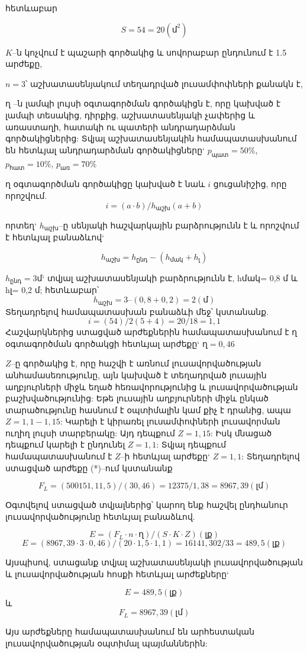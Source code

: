 \documentclass[12pt]{article}
\begin{document}
\begin{sloppypar}
հետևաբար         

$$S = 54 = 20 (մ^2)$$ 

$K$–ն կոչվում է պաշարի գործակից և սովորաբար ընդունում է 1.5 արժեքը,

$n=3$՝ աշխատասենյակում տեղադրված լուսամփոփների քանակն է,

$ղ$ –ն լամպի լույսի օգտագործման գործակիցն է, որը կախված է լամպի տեսակից, դիրքից, աշխատասենյակի չափերից և առաստաղի, հատակի ու պատերի անդրադարձման գործակիցներից: Տվյալ աշխատասենյակին համապատասխանում են հետևյալ անդրադարձման գործակիցները`  $p_{պատ} = 50\%$,  $p_{հատ} = 10\%$, $p_{առ} =70\%$

$ղ$ օգտագործման գործակիցը կախված է նաև $i$ ցուցանիշից, որը որոշվում.                        
$$i = ( a\cdot b ) / h_{աշխ}  ( a + b )$$

որտեղ` $h_{աշխ}$–ը սենյակի հաշվարկային բարձրությունն է և որոշվում է հետևյալ բանաձևով`

$$h_{աշխ} = h_{ընդ} - ( h_{մակ} + h_լ )$$

$h_{ընդ}= 3 մ$` տվյալ աշխատասենյակի բարձրությունն է,  hմակ= 0,8 մ  և  hլ= 0,2 մ; հետևաբար՝
$$h_{աշխ} = 3 – (0,8 + 0,2) = 2 (մ)$$
Տեղադրելով համապատասխան բանաձևի մեջ՝ կստանանք. 
$$i = ( 54 ) / 2 ( 5 + 4 ) = 20/18 = 1,1$$
Հաշվարկներից ստացված արժեքներին համապատասխանում է ղ օգտագործման գործակցի հետևյալ արժեքը` $ղ = 0,46$

$Z$–ը գործակից է, որը հաշվի է առնում լուսավորվածության անհամասեռությունը, այն կախված է  տեղադրված լուսային աղբյուրների միջև եղած հեռավորությունից և լուսավորվածության բաշխվածությունից: Եթե լուսային աղբյուրների միջև ընկած տարածությունը հասնում է օպտիմալին կամ քիչ է դրանից, ապա $Z = 1,1-1,15$: Կարելի է կիրառել լուսամփոփների լուսավորման ուղիղ լույսի տարբերակը: Այդ դեպքում $Z = 1,15$: Իսկ մնացած դեպքում կարելի է ընդունել $Z=1,1$: Տվյալ դեպքում համապատասխանում է $Z$–ի հետևյալ արժեքը` $Z=1,1$: Տեղադրելով ստացված արժեքը (*)–ում կստանանք

$$F_L = ( 500151,11,5 ) / ( 30,46 ) = 12375/1,38 = 8967,39 (լմ)$$

Օգտվելով ստացված տվյալներից՝ կարող ենք հաշվել ընդհանուր լուսավորվածությունը հետևյալ բանաձևով.              

$$E = ( F_L\cdot n\cdot ղ ) / ( S\cdot K\cdot Z ) (լք)$$
$$E = (8967,39\cdot 3\cdot 0,46) / (20\cdot 1,5\cdot 1,1) = 16141,302 / 33 = 489,5 (լք)$$

Այսպիսով, ստացանք տվյալ աշխատասենյակի լուսավորվածության և լուսավորվածության հոսքի հետևյալ արժեքները`   

$$E = 489,5 (լք)$$
և
$$F_L = 8967,39 (լմ)$$

Այս արժեքները համապատասխանում են արհեստական լուսավորվածության օպտիմալ պայմաններին:




\newpage


\end{sloppypar}
\end{document}
